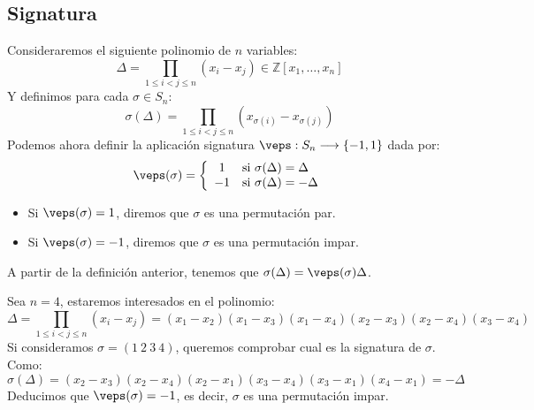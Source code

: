 \subsection{Signatura}
\begin{definicion}[Signatura]
    Consideraremos el siguiente polinomio de $n$ variables:
    \begin{equation*}
        \Delta = \prod_{1\leq i<j\leq n} (x_i-x_j) \in \mathbb{Z}[x_1,\ldots,x_n]
    \end{equation*}
    Y definimos para cada $\sigma\in S_n$:
    \begin{equation*}
        \sigma(\Delta) = \prod_{1\leq i<j\leq n}(x_{\sigma(i)}-x_{\sigma(j)})
    \end{equation*}
    Podemos ahora definir la aplicación signatura $\veps:S_n\longrightarrow \{-1,1\}$ dada por:
    \begin{equation*}
        \veps(\sigma) = \left\{\begin{array}{cl}
                1 & \text{si\ } \sigma(\Delta) = \Delta \\
                -1 & \text{si\ } \sigma(\Delta) = -\Delta 
        \end{array}\right.
    \end{equation*}
    \begin{itemize}
        \item Si $\veps(\sigma)=1$, diremos que $\sigma$ es una permutación par.
        \item Si $\veps(\sigma)=-1$, diremos que $\sigma$ es una permutación impar.
    \end{itemize}
\end{definicion}

\begin{observacion}
    A partir de la definición anterior, tenemos que $\sigma(\Delta)=\veps(\sigma)\Delta$.
\end{observacion}

\begin{ejemplo}
    Sea $n=4$, estaremos interesados en el polinomio:
    \begin{equation*}
        \Delta = \prod_{1\leq i<j\leq n} (x_i-x_j) = (x_1-x_2)(x_1-x_3)(x_1-x_4)(x_2-x_3)(x_2-x_4)(x_3-x_4)
    \end{equation*}
    Si consideramos $\sigma=(1\ 2\ 3\ 4)$, queremos comprobar cual es la signatura de $\sigma$. Como:
    \begin{equation*}
        \sigma(\Delta) = (x_2 - x_3)(x_2-x_4)(x_2-x_1)(x_3-x_4)(x_3-x_1)(x_4-x_1) = -\Delta
    \end{equation*}
    Deducimos que $\veps(\sigma)=-1$, es decir, $\sigma$ es una permutación impar.
\end{ejemplo}

